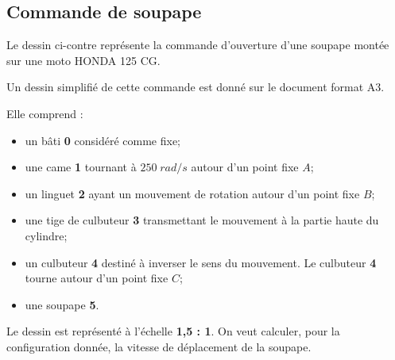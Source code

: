 \documentclass[10pt]{article}
\begin{document}
\subsection*{Commande de soupape}
\setcounter{subparagraph}{0}

\begin{minipage}[c]{.5\linewidth}

Le dessin ci-contre représente la commande d'ouverture d'une soupape montée sur une moto HONDA 125 CG.

Un dessin simplifié de cette commande est donné sur le document format A3.

Elle comprend :
\begin{itemize}
\item un bâti \textbf{0} considéré comme fixe;
\item une came \textbf{1} tournant à $250\; rad/s$ autour d'un point fixe $A$;
\item un linguet \textbf{2} ayant un mouvement de rotation autour d'un point fixe $B$;
\item une tige de culbuteur \textbf{3} transmettant le mouvement à la partie haute du cylindre;
\item un culbuteur \textbf{4} destiné à inverser le sens du mouvement. Le culbuteur \textbf{4} tourne autour d'un point fixe $C$;
\item une soupape \textbf{5}.
\end{itemize}

Le dessin est représenté à l'échelle \textbf{1,5 : 1}. On veut calculer, pour la configuration donnée, la vitesse de déplacement de la soupape.

\end{minipage}\hfill
\end{document}
